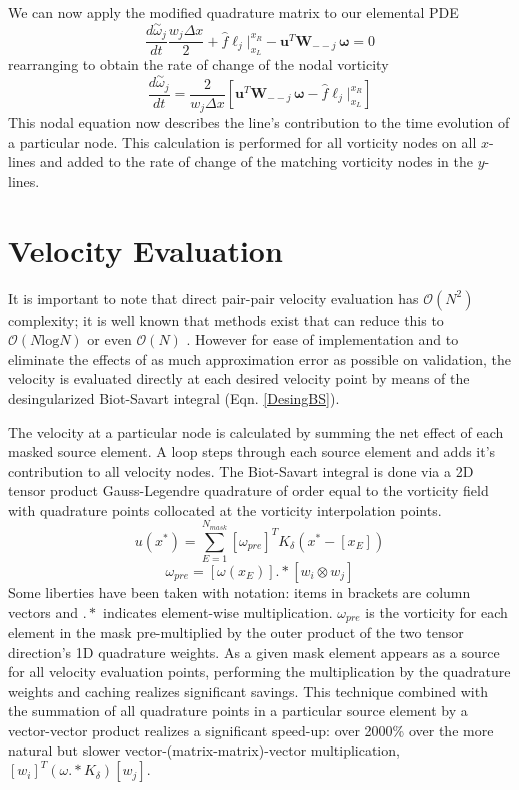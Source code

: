 \documentclass[letterpaper,12pt]{report}
\newcommand{\be}{\begin{equation}}
\newcommand{\ben}[1]{\begin{equation}\label{#1}}
\newcommand{\ee}{\end{equation}}
\newcommand{\aomega}{\overset{\sim}{\omega}}				%
\begin{document}
We can now apply the modified quadrature matrix to our elemental PDE
\ben{DGJoshTemp3} \frac{d \aomega_j}{dt} \frac{w_j \Delta x}{2}
+\hat{f}\ell_j \Big|^{x_R}_{x_L} 
- \mathbf{u}^T \mathbf{W}_{--j} \, \boldsymbol{\omega} = 0 \ee
rearranging to obtain the rate of change of the nodal vorticity
\ben{DGJosh} \frac{d \aomega_j}{dt}
=\frac{2}{w_j \Delta x} \left[\mathbf{u}^T \mathbf{W}_{--j} \, \boldsymbol{\omega} - \hat{f}\ell_j \Big|^{x_R}_{x_L}\right]  \ee
This nodal equation now describes the line's contribution to the time evolution of a particular node. This calculation is performed for all vorticity nodes on all $x$-lines and added to the rate of change of the matching vorticity nodes in the $y$-lines.

%
\section{Velocity Evaluation}\label{VelEval}
It is important to note that direct pair-pair velocity evaluation has $\mathcal{O}(N^2)$ complexity; it is well known that methods exist that can reduce this to $\mathcal{O}(N\text{log}N)$ or even $\mathcal{O}(N)$ \cite{SchumannSweet1976,LindsayKrasny2001,BarnesHut1986,GreengardRokhlin1987}. However for ease of implementation and to eliminate the effects of as much approximation error as possible on validation, the velocity is evaluated directly at each desired velocity point by means of the desingularized Biot-Savart integral (Eqn. \ref{DesingBS}). 

The velocity at a particular node is calculated by summing the net effect of each masked source element. A loop steps through each source element and adds it's contribution to all velocity nodes. The Biot-Savart integral is done via a 2D tensor product Gauss-Legendre quadrature of order equal to the vorticity field with quadrature points collocated at the vorticity interpolation points. 
\be u(x^*)= \sum_{E=1}^{N_{mask}} [\omega_{pre}]^TK_{\delta}(x^*-[x_E]) \ee
\be \omega_{pre} = [\omega(x_E)].*[w_i \otimes w_j]\ee
Some liberties have been taken with notation: items in brackets are column vectors and $.*$ indicates element-wise multiplication. $\omega_{pre}$ is the vorticity for each element in the mask pre-multiplied by the outer product of the two tensor direction's 1D quadrature weights. As a given mask element appears as a source for all velocity evaluation points, performing the multiplication by the quadrature weights and caching realizes significant savings. This technique combined with the summation of all quadrature points in a  particular source element by a vector-vector product realizes a significant speed-up: over 2000\% over the more natural but slower vector-(matrix-matrix)-vector multiplication, $[w_i]^T(\omega.*K_{\delta})[w_j]$.
\end{document}
